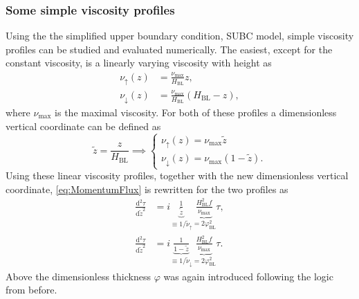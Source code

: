 \subsubsection{Some simple viscosity profiles}
Using the the simplified upper boundary condition, SUBC model, simple viscosity profiles can be studied and evaluated numerically. The easiest, except for the constant viscosity, is a linearly varying viscosity with height as 
\begin{subequations}
    \label{eq:LinearProfiles}   
 \begin{align}
    \label{eq:LinearIncreasing}
    \nu_\uparrow(z)&=\frac{\nu_\text{max}}{H_\text{BL}}z, \\
    \label{eq:LinearDecreasing}
    \nu_\downarrow(z)&=\frac{\nu_\text{max}}{H_\text{BL}}\left(H_\text{BL}-z\right), 
\end{align}
\end{subequations}
where $\nu_\text{max}$ is the maximal viscosity. For both of these profiles a dimensionless vertical coordinate can be defined as 
\begin{equation}
    \tilde z = \frac{z}{H_\text{BL}} \implies 
    \begin{cases}
        \nu_\uparrow(z)=\nu_\text{max}\tilde z \\
        \nu_\downarrow(z)=\nu_\text{max}\left(1-\tilde z\right). 
    \end{cases}
\end{equation}
Using these linear viscosity profiles, together with the new dimensionless vertical coordinate, \autoref{eq:MomentumFlux} is rewritten for the two profiles as 
\begin{subequations}
\label{eq:SUBCLinear}
\begin{align}
    \label{eq:SUBCLinearIncreasing}
    \frac{\mathrm{d}^2\tau}{\mathrm{d} \tilde z^2}&=i\underbrace{\frac{1}{ \tilde z}}_{\equiv 1/\tilde\nu_\uparrow}\underbrace{\frac{H_\text{BL}^2f}{\nu_\text{max}}}_{=2\varphi_\text{BL}^2}\tau,\\
    \label{eq:SUBCLinearDecreasing}
    \frac{\mathrm{d}^2\tau}{\mathrm{d} \tilde z^2}&=i\underbrace{\frac{1}{ 1-\tilde z}}_{\equiv 1/\tilde\nu_\downarrow}\underbrace{\frac{H_\text{BL}^2f}{\nu_\text{max}}}_{=2\varphi_\text{BL}^2}\tau.
\end{align}
\end{subequations}
Above the dimensionless thickness $\varphi$ was again introduced following the logic from before.

